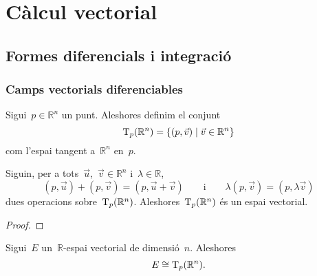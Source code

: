 \documentclass[../../main.tex]{subfiles}
\begin{document}

\chapter{Càlcul vectorial}
\section{Formes diferencials i integració}
    \subsection{Camps vectorials diferenciables}
    \begin{definition}
        \label{def:espai tangent a Rn}
        Sigui~\(p\in\mathbb{R}^{n}\) un punt.
        Aleshores definim el conjunt
        \begin{equation*}
            \operatorname{T}_{p}(\mathbb{R}^{n})=\{(p,\vec{v})\mid\vec{v}\in\mathbb{R}^{n}\}
        \end{equation*}
        com l'espai tangent a~\(\mathbb{R}^{n}\) en~\(p\).
    \end{definition}
    \begin{proposition}
        \label{prop:l'espai tangent a Rn és un espai vectorial}
        Siguin, per a tots~\(\vec{u}\),~\(\vec{v}\in\mathbb{R}^{n}\) i~\(\lambda\in\mathbb{R}\),
        \begin{equation*}
            (p,\vec{u})+(p,\vec{v})=(p,\vec{u}+\vec{v})
            \qquad\text{i}\qquad
            \lambda(p,\vec{v})=(p,\lambda\vec{v})
        \end{equation*}
        dues operacions sobre~\(\operatorname{T}_{p}(\mathbb{R}^{n})\).
        Aleshores~\(\operatorname{T}_{p}(\mathbb{R}^{n})\) és un espai vectorial.
    \end{proposition}
    \begin{proof}
    \end{proof}
    \begin{observation}
        \label{prop:l'espai tangent a Rn és isomorf a un R-espai vectorial de dimensió n}
        Sigui~\(E\) un~\(\mathbb{R}\)-espai vectorial de dimensió~\(n\).
        Aleshores
        \begin{equation*}
            E\cong\operatorname{T}_{p}(\mathbb{R}^{n}).
        \end{equation*}
    \end{observation}
\end{document}
